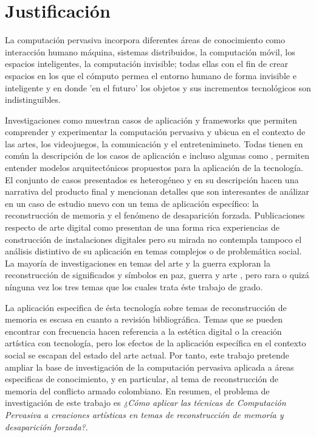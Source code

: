 \section{Justificación}
\label{justificacion}

La computación pervasiva incorpora diferentes áreas de conocimiento como interacción humano máquina, sistemas distribuidos, la computación móvil, los espacios inteligentes, la computación invisible; todas ellas con el fin de crear espacios en los que el cómputo permea el entorno humano de forma invisible e inteligente y en donde 'en el futuro' los objetos y sus incrementos tecnológicos son indistinguibles\cite{RN1}.

Investigaciones como \cite{RN1,RN34,RN38,RN39,RN31,RN17,RN24,RN52,RN29,RN32,RN49,RN18,RN30,} muestran casos de aplicación y frameworks que permiten comprender y experimentar la computación pervasiva y ubicua en el contexto de las artes, los videojuegos, la comunicación y el entretenimineto. Todas tienen en común la descripción de los casos de aplicación e incluso algunas como \cite{RN40}, permiten entender modelos arquitectónicos propuestos para la aplicación de la tecnología. El conjunto de casos presentados es heterogéneo y en su descripción hacen una narrativa del producto final y mencionan detalles que son interesantes de análizar en un caso de estudio nuevo con un tema de aplicación específico: la reconstrucción de memoria y el fenómeno de desaparición forzada. Publicaciones respecto de arte digital como \cite{RN37,RN44} presentan de una forma rica experiencias de construcción de instalaciones digitales pero su mirada no contempla tampoco el análisis distintivo de su aplicación en temas complejos o de problemática social. La mayoría de investigaciones en temas del arte y la guerra exploran la reconstrucción de significados y símbolos en paz, guerra y arte \cite{Jimenez201672,EstripeautBourjac2013154}, pero rara o quizá nínguna vez los tres temas que los cuales trata éste trabajo de grado.

La aplicación especifica de ésta tecnología sobre temas de reconstrucción de memoria es escasa en cuanto a revisión bibliográfica. Temas que se pueden encontrar con frecuencia hacen referencia a la estética digital o la creación artística con tecnología\cite{RN9}, pero los efectos de la aplicación específica en el contexto social se escapan del estado del arte actual. Por tanto, este trabajo pretende ampliar la base de investigación de la computación pervasiva aplicada a áreas especificas de conocimiento, y en particular, al tema de reconstrucción de memoria del conflicto armado colombiano. En resumen, el problema de investigación de este trabajo es \textit{¿Cómo aplicar las técnicas de Computación Pervasiva a creaciones artísticas en temas de reconstrucción de memoría y desaparición forzada?}.


